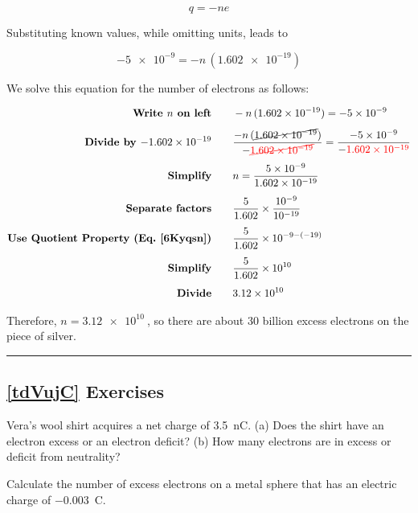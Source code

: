 \documentclass[dvipsnames]{article}
\begin{document}
\begin{equation*}
    q = -ne
\end{equation*}

Substituting known values, while omitting units, leads to

\begin{equation*}
     \num{-5e-9} = - n\,(\num{1.602e-19})
\end{equation*}

We solve this equation for the number of electrons as follows:

\begin{align*}
    \textbf{Write $n$ on left} \qquad & - n\,(\SI{1.602e-19}{}) = \SI{-5e-9}{}\\[1ex]
    \textbf{Divide by \SI{-1.602e-19}{}} \qquad & \frac{- n\,(\cancel{\SI{1.602e-19}{}})}{- \textcolor{red}{\cancel{\SI{1.602e-19}{}}}} = \frac{\SI{-5e-9}{}}{- \textcolor{red}{\SI{1.602e-19}{}}}\\[1ex]
    \textbf{Simplify} \qquad & n = \frac{\qty{5e-9}{}}{\qty{1.602e-19}{}}\\[1ex]
    \textbf{Separate factors} \qquad & \frac{5}{1.602} \times \frac{10^{-9}}{10^{-19}}\\[1ex]
    \textbf{Use Quotient Property (Eq.~\ref{6Kyqsn})} \qquad & \frac{5}{1.602} \times 10^{-9 - (-19)}\\[1ex]
    \textbf{Simplify} \qquad & \frac{5}{1.602} \times 10^{10}\\[1ex]
    \textbf{Divide} \qquad & \SI{3.12e10}{}
\end{align*}

Therefore, $n = \SI{3.12e10}{}$, so there are about 30 billion excess electrons on the piece of silver.

\vspace{1em}
\hrule

\subsection*{\ref{tdVujC} Exercises}

\begin{exercise} \label{994stj}
    Vera's wool shirt acquires a net charge of \SI{3.5}{nC}. (a) Does the shirt have an electron excess or an electron deficit? (b) How many electrons are in excess or deficit from neutrality?
\end{exercise}

\begin{exercise} \label{IRX4Zr}
    Calculate the number of excess electrons on a metal sphere that has an electric charge of \qty{-0.003}{C}.
\end{exercise}
\end{document}
